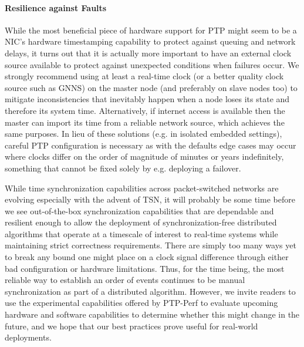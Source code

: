 \paragraph{Resilience against Faults} While the most beneficial piece of hardware support for PTP might seem to be a NIC's hardware timestamping capability to protect against queuing and network delays, it turns out that it is actually more important to have an external clock source available to protect against unexpected conditions when failures occur. We strongly recommend using at least a real-time clock (or a better quality clock source such as GNNS) on the master node (and preferably on slave nodes too) to mitigate inconsistencies that inevitably happen when a node loses its state and therefore its system time. Alternatively, if internet access is available then the master can import its time from a reliable network source, which achieves the same purposes. In lieu of these solutions (e.g. in isolated embedded settings), careful PTP configuration is necessary as with the defaults edge cases may occur where clocks differ on the order of magnitude of minutes or years indefinitely, something that cannot be fixed solely by e.g. deploying a failover.


While time synchronization capabilities across packet-switched networks are evolving especially with the advent of TSN, it will probably be some time before we see out-of-the-box synchronization capabilities that are dependable and resilient enough to allow the deployment of synchronization-free distributed algorithms that operate at a timescale of interest to real-time systems while maintaining strict correctness requirements. There are simply too many ways yet to break any bound one might place on a clock signal difference through either bad configuration or hardware limitations. Thus, for the time being, the most reliable way to establish an order of events continues to be manual synchronization as part of a distributed algorithm. However, we invite readers to use the experimental capabilities offered by PTP-Perf to evaluate upcoming hardware and software capabilities to determine whether this might change in the future, and we hope that our best practices prove useful for real-world deployments.
